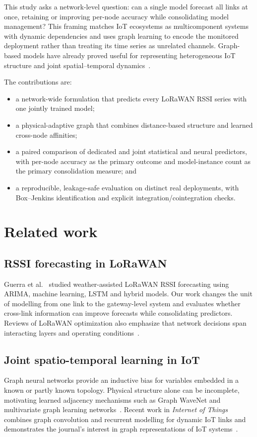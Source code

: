 \documentclass[preprint,12pt]{elsarticle}
\begin{document}
This study asks a network-level question: can a single model forecast all links at
once, retaining or improving per-node accuracy while consolidating model management?
This framing matches IoT ecosystems as multicomponent systems with dynamic
dependencies and uses graph learning to encode the monitored deployment rather than
treating its time series as unrelated channels. Graph-based models have already proved
useful for representing heterogeneous IoT structure and joint spatial--temporal
dynamics~\cite{ali2024powerful,abdelbaky2024gcn}.

The contributions are:
\begin{itemize}
  \item a network-wide formulation that predicts every LoRaWAN RSSI series with one
        jointly trained model;
  \item a physical-adaptive graph that combines distance-based structure and learned
        cross-node affinities;
  \item a paired comparison of dedicated and joint statistical and neural predictors,
        with per-node accuracy as the primary outcome and model-instance count as the
        primary consolidation measure; and
  \item a reproducible, leakage-safe evaluation on distinct real deployments, with
        Box--Jenkins identification and explicit integration/cointegration checks.
\end{itemize}

\section{Related work}
\subsection{RSSI forecasting in LoRaWAN}
Guerra et al.~\cite{guerra2024forecasting} studied weather-assisted LoRaWAN RSSI
forecasting using ARIMA, machine learning, LSTM and hybrid models. Our work changes the
unit of modelling from one link to the gateway-level system and evaluates whether
cross-link information can improve forecasts while consolidating predictors. Reviews
of LoRaWAN optimization also emphasize that network decisions span interacting layers
and operating conditions~\cite{loraReview2024}.

\subsection{Joint spatio-temporal learning in IoT}
Graph neural networks provide an inductive bias for variables embedded in a known or
partly known topology. Physical structure alone can be incomplete, motivating learned
adjacency mechanisms such as Graph WaveNet and multivariate graph learning
networks~\cite{wu2019graph,wulog2020connecting}. Recent work in \emph{Internet of
Things} combines graph convolution and recurrent modelling for dynamic IoT links and
demonstrates the journal's interest in graph representations of IoT
systems~\cite{abdelbaky2024gcn,ali2024powerful}.
\end{document}
